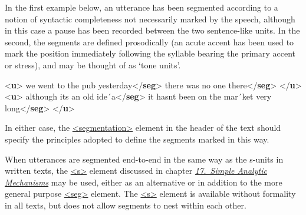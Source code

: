 In the first example below, an utterance has been segmented according to a notion of syntactic completeness not necessarily marked by the speech, although in this case a pause has been recorded between the two sentence-like units. In the second, the segments are defined prosodically (an acute accent has been used to mark the position immediately following the syllable bearing the primary accent or stress), and may be thought of as ‘tone units’. \par\bgroup{}\exampleFont \begin{shaded}\noindent\mbox{}{<\textbf{u}>}\mbox{}\newline 
{}we went to the pub yesterday{</\textbf{seg}>}\mbox{}\newline 
{}\mbox{}\newline 
{}there was no one there{</\textbf{seg}>}\mbox{}\newline 
{</\textbf{u}>}\mbox{}\newline 
{<\textbf{u}>}\mbox{}\newline 
{}although its an old ide´a{</\textbf{seg}>}\mbox{}\newline 
{}it hasnt been on the mar´ket very long{</\textbf{seg}>}\mbox{}\newline 
{</\textbf{u}>}\end{shaded}\egroup\par \noindent   In either case, the \hyperref[TEI.segmentation]{<segmentation>} element in the header of the text should specify the principles adopted to define the segments marked in this way.\par
When utterances are segmented end-to-end in the same way as the s-units in written texts, the \hyperref[TEI.s]{<s>} element discussed in chapter \textit{\hyperref[AI]{17.\ Simple Analytic Mechanisms}} may be used, either as an alternative or in addition to the more general purpose \hyperref[TEI.seg]{<seg>} element. The \hyperref[TEI.s]{<s>} element is available without formality in all texts, but does not allow segments to nest within each other.\par
